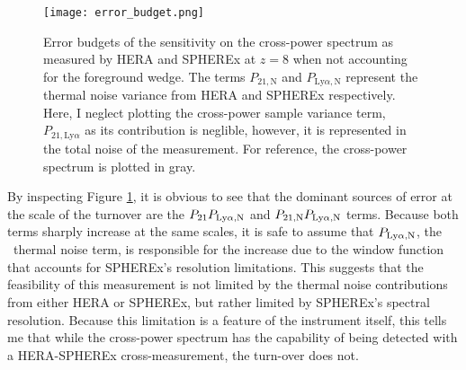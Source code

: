 \begin{figure}[th]
	\centering
	\texttt{[image: error\_budget.png]}
	\caption[Cross-Power Spectrum Error Budget]{Error budgets of the sensitivity on the cross-power spectrum as measured by HERA and SPHEREx
  at $z = 8$ when not accounting for the foreground wedge. The terms $P_{21, \textrm{N}}$ and $P_{\textrm{Ly}\alpha, \textrm{N}}$ represent the thermal noise variance from HERA and SPHEREx respectively. Here, I neglect plotting the cross-power sample variance term, $P_{21, \textrm{Ly}\alpha }$ as its contribution is neglible, however, it is represented in the total noise of the measurement. For reference, the cross-power spectrum is plotted in gray.}
	\label{fig:error_budget}
\end{figure}

By inspecting Figure \ref{fig:error_budget}, it is obvious to see that the dominant sources of error at the scale of the turnover are the $P_{21} P_{\rm Ly\alpha, N}$ and $P_{21,\rm N} P_{\rm Ly\alpha, N}$
terms. Because both terms sharply increase at the same scales, it is safe to assume
that $P_{\rm Ly\alpha, N}$, the \lya\ thermal noise term, is responsible for the
increase due to the window function that accounts for SPHEREx's resolution limitations.
This suggests that the feasibility of this measurement is not limited by the thermal
noise contributions from either HERA or SPHEREx, but rather limited by SPHEREx's spectral
resolution. Because this limitation is a feature of the instrument itself, this tells me that
while the cross-power spectrum has the capability of being detected with a HERA-SPHEREx
cross-measurement, the turn-over does not.
